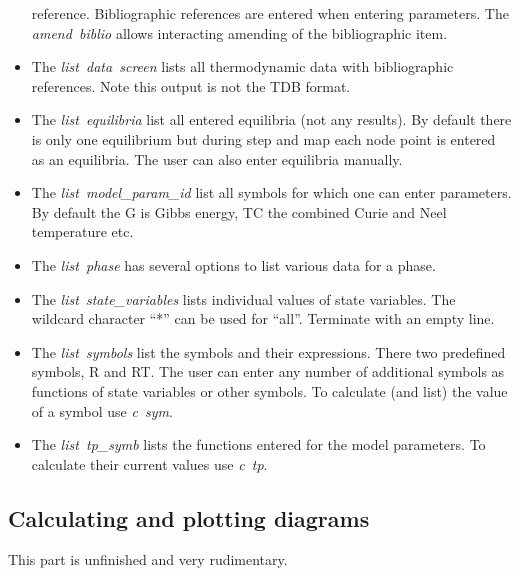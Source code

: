 \documentclass[12pt]{article}
\begin{document}
\begin{itemize}
  reference.  Bibliographic references are entered when entering
  parameters.  The {\em amend~biblio} allows interacting amending of
  the bibliographic item.
\item The {\em list~data~screen} lists all thermodynamic data with
  bibliographic references.  Note this output is not the TDB format.
\item The {\em list~equilibria} list all entered equilibria (not
  any results).  By default there is only one equilibrium but during step
  and map each node point is entered as an equilibria.  The user can
  also enter equilibria manually.
\item The {\em list~model\_param\_id} list all symbols for which one
  can enter parameters.  By default the G is Gibbs energy, TC the
  combined Curie and Neel temperature etc.
\item The {\em list~phase} has several options to list various data
  for a phase.
\item The {\em list~state\_variables} lists individual values of state
  variables.  The wildcard character ``*'' can be used for ``all''.
  Terminate with an empty line.
\item The {\em list~symbols} list the symbols and their expressions.
  There two predefined symbols, R and RT.  The user can enter any
  number of additional symbols as functions of state variables or
  other symbols.  To calculate (and list) the value of a symbol use
  {\em c~sym}.
\item The {\em list~tp\_symb} lists the functions entered for the
  model parameters.  To calculate their current values use {\em c~tp}.
\end{itemize}

\subsection{Calculating and plotting diagrams}

This part is unfinished and very rudimentary.
\end{document}
